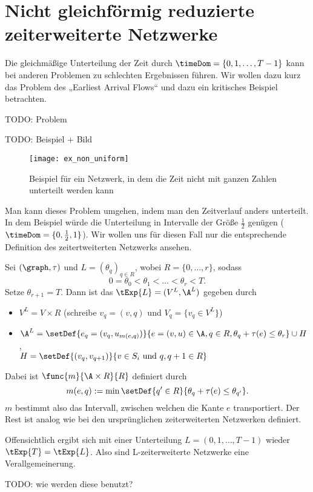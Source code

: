 \section{Nicht gleichförmig reduzierte zeiterweiterte Netzwerke}\label{sec:nonunif_cond}
Die gleichmäßige Unterteilung der Zeit durch $\timeDom = \{0,1, \ldots, T-1\}$ kann bei
anderen Problemen zu schlechten Ergebnissen führen. Wir wollen dazu kurz das Problem
des „Earliest Arrival Flows“ und dazu ein kritisches Beispiel betrachten.

TODO: Problem

\begin{example}
TODO: Beispiel + Bild
    \begin{figure}[H]
    \centering
    \texttt{[image: ex\_non\_uniform]}
    \caption{Beispiel für ein Netzwerk, in dem die Zeit nicht mit ganzen
                Zahlen unterteilt werden kann}
    \label{fig:ex_non_uniform}
    \end{figure}
\end{example}

Man kann dieses Problem umgehen, indem man den Zeitverlauf anders unterteilt. In dem
Beispiel würde die Unterteilung in Intervalle der Größe $\frac{1}{2}$
genügen ($\timeDom = \{0, \frac{1}{2}, 1\}$). Wir wollen uns für diesen Fall nur
die entsprechende Definition des zeitertweiterten Netzwerks ansehen.

\begin{definition}
    Sei $(\graph, \tau)$ und $L = (\theta_q)_{q \in R}$, wobei $R = \{0, \ldots, r\}$,
    sodass
    \[
        0 = \theta_0 < \theta_1 < \ldots < \theta_r < T.
    \]
    Setze $\theta_{r+1} = T$.
    Dann ist das  $\tExp{L} = (V^L, \A^L)$
    gegeben durch
    \begin{itemize}
        \item $V^L = V \times R$ (schreibe $v_q = (v, q)$ und
            $V_q = \{v_q \in V^L\}$)
        \item $\A^L = \setDef{e_q = (v_q, u_{m(e, q)})}
                        {e = (v, u) \in \A, q \in R, \theta_q + \tau(e) \leq \theta_r}
                    \cup H$, \\
             $H = \setDef{(v_q, v_{q+1})}
                                    {v \in S_i \text{ und } q, q+1 \in R}$
    \end{itemize}

    Dabei ist $\func{m}{\A \times R}{R}$ definiert durch
    \[
        m(e, q) := \min \setDef{q' \in R}{\theta_q + \tau(e) \leq \theta_{q'}}.
    \]
    $m$ bestimmt also das Intervall, zwischen welchen die Kante $e$ transportiert.
    Der Rest ist analog wie bei den ursprünglichen zeiterweiterten Netzwerken
    definiert.
\end{definition}

\begin{remark}
    Offensichtlich ergibt sich mit einer Unterteilung $L = (0, 1, \ldots, T-1)$
    wieder $\tExp{T} = \tExp{L}$. Also sind L-zeiterweiterte Netzwerke
    eine Verallgemeinerung.
\end{remark}

TODO: wie werden diese benutzt?
